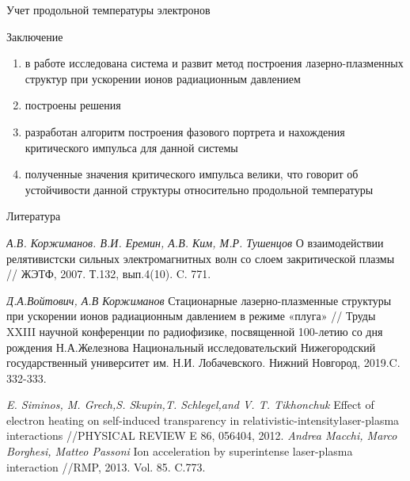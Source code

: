 \begin{frame}[t]{}
\begin{columns}[t]
\begin{column}{.48\linewidth}
\begin{block}{Учет продольной температуры электронов}
        \end{block}
        \begin{block}{Заключение}
 			\begin{enumerate}
            \item в работе исследована система и развит метод построения лазерно-плазменных структур при ускорении ионов радиационным давлением
           \item построены решения
       	\item разработан алгоритм построения фазового портрета и нахождения критического импульса для данной системы
       	\item полученные значения критического импульса велики, что говорит об устойчивости данной структуры относительно продольной температуры
 			\end{enumerate}

 
        \end{block}
        \begin{block}{Литература}
            \footnotesize
            \begin{thebibliography}{}
                 \textit{А.В. Коржиманов. В.И. Еремин, А.В. Ким, М.Р. Тушенцов}
                О взаимодействии релятивистски сильных электромагнитных волн со слоем закритической плазмы // ЖЭТФ, 2007. Т.132, вып.4(10).  C. 771.

                \bibitem{}    \textit{Д.А.Войтович, А.В Коржиманов} Стационарные лазерно-плазменные структуры при ускорении ионов радиационным давлением в режиме «плуга» // Труды XXIII научной конференции по радиофизике, посвященной 100-летию со дня рождения Н.А.Железнова Национальный исследовательский Нижегородский государственный университет им. Н.И. Лобачевского. Нижний Новгород, 2019.C. 332-333.
    
    			\bibitem{} \textit{E. Siminos, M. Grech,S. Skupin,T. Schlegel,and V. T. Tikhonchuk} Effect of electron heating on self-induced transparency in relativistic-intensitylaser-plasma interactions //PHYSICAL REVIEW E 86, 056404, 2012.
    			\bibitem{} \textit {Andrea Macchi, Marco Borghesi, Matteo Passoni} Ion acceleration by superintense laser-plasma interaction //RMP, 2013. Vol. 85. C.773.


\end{thebibliography}
\end{block}
\end{column}
\end{columns}
\end{frame}
